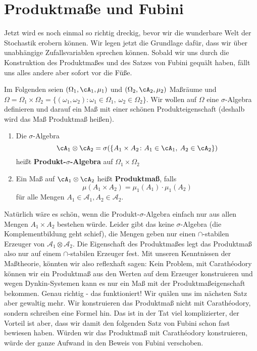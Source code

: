 \marginpar{\textcolor{red}{Vorlesung 18}}

\section{Produktmaße und Fubini}
Jetzt wird es noch einmal so richtig dreckig, bevor wir die wunderbare Welt der Stochastik erobern k\"onnen. Wir legen jetzt die Grundlage daf\"ur, dass wir \"uber unabh\"angige Zufallsvariablen sprechen k\"onnen. Sobald wir uns durch die Konstruktion des Produktma\ss es und des Satzes von Fubini gequ\"alt haben, f\"allt uns alles andere aber sofort vor die F\"u\ss e.\smallskip

Im Folgenden seien $(\Omega_1, \cA_1, \mu_1)$ und $(\Omega_2, \cA_2, \mu_2)$ Maßräume und $\Omega = \Omega_1 \times \Omega_2 = \{ (\omega_1, \omega_2)\colon \omega_1 \in \Omega_1, \: \omega_2 \in \Omega_2 \}$. Wir wollen auf $\Omega$ eine $\sigma$-Algebra definieren und darauf ein Ma\ss{} mit einer sch\"onen Produkteigenschaft (deshalb wird das Ma\ss{} Produktma\ss{} hei\ss en).
\begin{deff}
	\begin{enumerate}[label=(\roman*)]\abs
		\item Die $\sigma$-Algebra $$\cA_1 \otimes \cA_2 = \sigma(\{ A_1\times A_2 \colon A_1 \in \cA_1, \: A_2 \in \cA_2 \})$$ heißt \textbf{Produkt-$\sigma$-Algebra} auf $ \Omega_1 \times \Omega_2 $ 
		\item Ein Maß auf $ \cA_1 \otimes \cA_2 $ heißt \textbf{Produktmaß}, falls $$ \mu(A_1\times A_2) = \mu_1(A_1) \cdot \mu_1(A_2)$$
		f\"ur alle Mengen $A_1\in \mathcal A_1, A_2\in \mathcal A_2$.
	\end{enumerate}
\end{deff}
Nat\"urlich w\"are es sch\"on, wenn die Produkt-$\sigma$-Algebra einfach nur aus allen Mengen $A_1\times A_2$ bestehen w\"urde. Leider gibt das keine $\sigma$-Algebra (die Komplementbildung geht schief), die Mengen geben nur einen $\cap$-stabilen Erzeuger von $\mathcal A_1\otimes \mathcal A_2$. Die Eigenschaft des Produktma\ss es legt das Produktma\ss{} also nur auf einem $\cap$-stabilen Erzeuger fest. Mit unseren Kenntnissen der Ma\ss theorie, k\"onnten wir also reflexhaft sagen: Kein Problem, mit Carath\'eodory k\"onnen wir ein Produktma\ss{} aus den Werten auf dem Erzeuger konstruieren und wegen Dynkin-Systemen kann es nur ein Ma\ss{} mit der Produktma\ss eigenschaft bekommen. Genau richtig - das funktioniert! Wir qu\"alen uns im n\"achsten Satz aber gewaltig mehr. Wir konstruieren das Produktma\ss{} nicht mit Carath\'eodory, sondern schreiben eine Formel hin. Das ist in der Tat viel komplizierter, der Vorteil ist aber, dass wir damit den folgenden Satz von Fubini schon fast bewiesen haben. W\"urden wir das Produktma\ss{} mit Carath\'eodory konstruieren, w\"urde der ganze Aufwand in den Beweis von Fubini verschoben.




